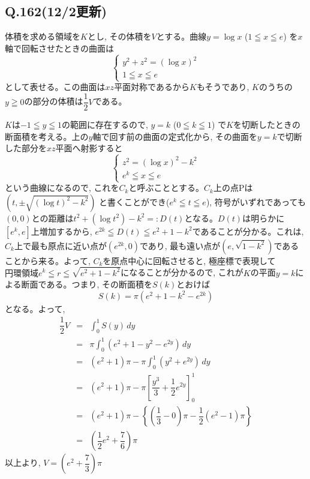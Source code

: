 \documentclass[twocolumn]{jbook}
\theoremstyle{definition}
\newcommand{\bolm}[1]{{\mbox{\boldmath $#1$}}}
\newcommand{\disp}{\displaystyle}
\newcommand{\beqn}{\begin{eqnarray*}}
\newcommand{\eeqn}{\end{eqnarray*}}
\newcommand{\bcas}{\begin{cases}}
\newcommand{\ecas}{\end{cases}}
\newcommand{\mr}{\mathrm}
\renewcommand{\leq}{\leqq}
\renewcommand{\geq}{\geqq}
\begin{document}
\subsection*{Q.162(12/2更新)}
体積を求める領域を$K$とし, その体積を$V$とする。曲線$y=\log{x}$ ($1\leq x \leq e$) を$x$軸で回転させたときの曲面は
\[\bcas
y^2+z^2 = (\log{x})^2\\
1\leq x\leq e
\ecas\]
として表せる。この曲面は$xz$平面対称であるから$K$もそうであり, $K$のうちの$y\geq 0$の部分の体積は$\dfrac{1}{2}V$である。\par
$K$は$-1\leq y\leq 1$の範囲に存在するので, $y=k$ ($0\leq k\leq 1$) で$K$を切断したときの断面積を考える。上の$y$軸で回す前の曲面の定式化から, その曲面を$y=k$で切断した部分を$xz$平面へ射影すると
\[
\bcas
z^2 = (\log{x})^2 - k^2\\
e^{k} \leq x\leq e 
\ecas
\]
という曲線になるので, これを$C_k$と呼ぶこととする。$C_k$上の点$\mr{P}$は$(t,\pm\sqrt{(\log{t})^2 - k^2})$ と書くことができ($e^{k} \leq t\leq e$), 符号がいずれであっても$(0,0)$との距離は$t^2+(\log{t}^2) - k^2=:D(t)$となる。$D(t)$は明らかに$[e^{k}, e]$上増加するから, $ e^{2k} \leq D(t) \leq e^2+1-k^2$であることが分かる。これは, $C_k$上で最も原点に近い点が$(e^{2k}, 0)$であり, 最も遠い点が$(e,\sqrt{1-k^2})$であることから来る。よって, $C_k$を原点中心に回転させると, 極座標で表現して\bolm{円環領域 e^{k} \leq r \leq \sqrt{e^2+1-k^2}}になることが分かるので, これが$K$の平面$y=k$による断面である。つまり, その断面積を$S(k)$とおけば
\[S(k) = \pi(e^2+1-k^2 - e^{2k})\]
となる。よって, 
\beqn
\dfrac{1}{2}V &=& \disp\int_{0}^{1} S(y) \, dy \\
&=& \pi\disp\int_{0}^{1}(e^2+1-y^2 - e^{2y})\, dy\\
&=& (e^2+1)\pi - \pi\disp\int_{0}^{1} (y^2 + e^{2y})\, dy\\
&=& (e^2+1)\pi - \pi\left[ \dfrac{y^3}{3} + \dfrac{1}{2} e^{2y} \right]_{0}^{1}\\
&=& (e^2+1)\pi - \left\{\left(\dfrac{1}{3} - 0\right)\pi - \dfrac{1}{2}\left(e^2 - 1\right)\pi\right\}\\
&=& \left( \dfrac{1}{2}e^2 + \dfrac{7}{6} \right)\pi
\eeqn
以上より, \bolm{V=\left(e^2+\dfrac{7}{3}\right)\pi}




\clearpage
\end{document}
